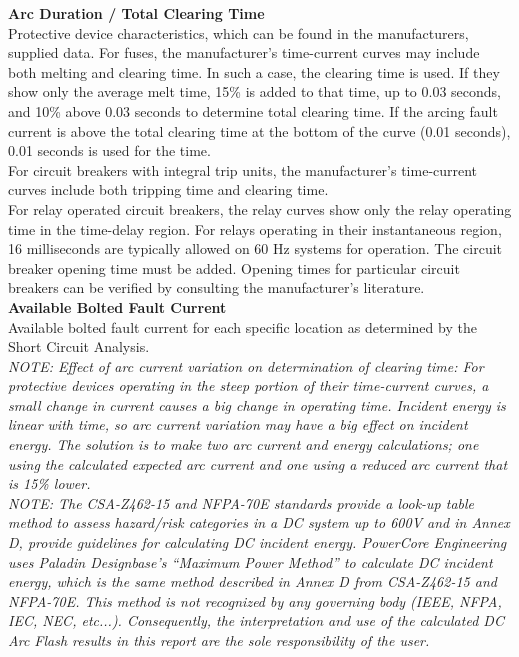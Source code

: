 \noindent\textbf{Arc Duration / Total Clearing Time   } \\
\noindent Protective device characteristics, which can be found in the manufacturers, supplied data. For fuses, the manufacturer's time-current curves may include both melting and clearing time. In such a case, the clearing time is used. If they show only the average melt time, 15\% is added to that time, up to 0.03 seconds, and 10\% above 0.03 seconds to determine total clearing time. If the arcing fault current is above the total clearing time at the bottom of the curve (0.01 seconds), 0.01 seconds is used for the time. \\
For circuit breakers with integral trip units, the manufacturer's time-current curves include both tripping time and clearing time. \\

\noindent For relay operated circuit breakers, the relay curves show only the relay operating time in the time-delay region. For relays operating in their instantaneous region, 16 milliseconds are typically allowed on 60 Hz systems for operation. The circuit breaker opening time must be added. Opening times for particular circuit breakers can be verified by consulting the manufacturer's literature. \\
 
  
\noindent\textbf{Available Bolted Fault Current}  \\ 
Available bolted fault current for each specific location as determined by the Short Circuit Analysis. \\
 
\noindent\emph{NOTE: Effect of arc current variation on determination of clearing time:    
For protective devices operating in the steep portion of their time-current curves, a small change in current causes a big change in operating time. Incident energy is linear with time, so arc current variation may have a big effect on incident energy. The solution is to make two arc current and energy calculations; one using the calculated expected arc current and one using a reduced arc current that is 15\% lower.}\\ 

\noindent\emph{NOTE: The CSA-Z462-15 and NFPA-70E standards provide a look-up table method to assess hazard/risk categories in a DC system up to 600V and in Annex D, provide guidelines for calculating DC incident energy.  PowerCore Engineering uses Paladin Designbase's "`Maximum Power Method"' to calculate DC incident energy, which is the same method described in Annex D from CSA-Z462-15 and NFPA-70E.  This method is not recognized by any governing body (IEEE, NFPA, IEC, NEC, etc...). Consequently, the interpretation and use of the calculated DC Arc Flash results in this report are the sole responsibility of the user.}  

